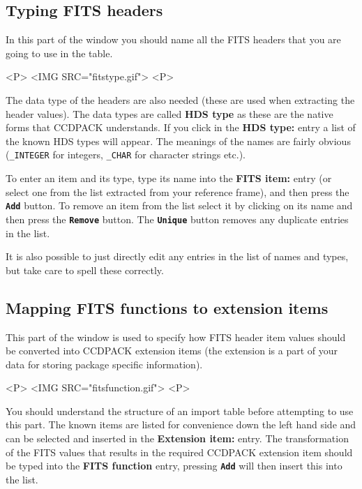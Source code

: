 \documentclass[11pt]{article}
\newcommand{\htmlref}[2]{#1}
\newcommand{\xref}[3]{#1}
\newcommand{\xlabel}[1]{}
\newcommand{\butt}[1]{{\bf \tt #1}}
\newcommand{\wlab}[1]{{\bf #1}}
\newcommand{\text}[1]{{\tt #1}}
\begin{document}
\subsection{Typing FITS headers \xlabel{CCDCreateImportTableFITStypes}}
In this part of the window you should name all the FITS headers that
you are going to use in the table.
\begin{rawhtml}
<P>
<IMG SRC="fitstype.gif">
<P>
\end{rawhtml}
The data type of the headers are also needed (these are used when
extracting the header values). The data types are called
\wlab{HDS type} as these are the native forms that CCDPACK understands. If you
click in the \wlab{HDS type:} entry a list of the known HDS types will
appear. The meanings of the names are fairly obvious (\text{\_INTEGER}
for integers, \text{\_CHAR} for character strings etc.).

To enter an item and its type, type its name into the \wlab{FITS
item:} entry (or select one from the list extracted from your
\htmlref{reference}{refndf} frame), and then press the \butt{Add}
button. To remove an item from the list select it by clicking on its
name and then press the \butt{Remove} button. The \butt{Unique} button
removes any duplicate entries in the list.

It is also possible to just directly edit any entries in the list of
names and types, but take care to spell these correctly.

\subsection{Mapping FITS functions to extension items
            \xlabel{CCDCreateImportTableFunctions}}
This part of the window is used to specify how FITS header item values
should be converted into CCDPACK extension items (the extension is a
part of your data for storing package specific information).
\begin{rawhtml}
<P>
<IMG SRC="fitsfunction.gif">
<P>
\end{rawhtml}

You should understand the
\xref{structure}{sun139}{TableFormat}
of an import table before attempting to use this part. The known items
are listed for convenience down the left hand side and can be selected
and inserted in the \wlab{Extension item:} entry. The transformation
of the FITS values that results in the required CCDPACK extension item
should be typed into the \wlab{FITS function} entry, pressing
\butt{Add} will then insert this into the list.
\end{document}
